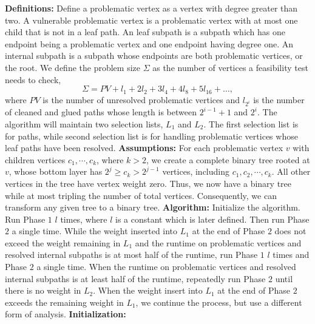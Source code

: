 \documentclass[12pt]{article}
\begin{document}


\begin{spacing}{3}
\noindent\textbf{Definitions:}
Define a problematic vertex as a vertex with degree greater than two. A vulnerable problematic vertex is a problematic vertex with at most one child that is not in a leaf path. An leaf subpath is a subpath which has one endpoint being a problematic vertex and one endpoint having degree one. An internal subpath is a subpath whose endpoints are both problematic vertices, or the root. We define the problem size $\Sigma$ as the number of vertices a feasibility test needs to check,
\[\Sigma=PV+l_1+2l_2+3l_4+4l_8+5l_{16}+\ldots,\]
where $PV$ is the number of unresolved problematic vertices and $l_{2^i}$ is the number of cleaned and glued paths whose length is between $2^{i-1}+1$ and $2^i$. The algorithm will maintain two selection lists, $L_1$ and $L_2$. The first selection list is for paths, while second selection list is for handling problematic vertices whose leaf paths have been resolved.
\vskip 0.2in\noindent
\textbf{Assumptions:}
For each problematic vertex $v$ with children vertices $c_1,\cdots, c_k$, where $k>2$, we create a complete binary tree rooted at $v$, whose bottom layer has $2^j\ge c_k>2^{j-1}$ vertices, including $c_1, c_2,\cdots, c_k$. All other vertices in the tree have vertex weight zero. Thus, we now have a binary tree while at most tripling the number of total vertices. Consequently, we can transform any given tree to a binary tree.
\vskip 0.2in\noindent
\textbf{Algorithm:}
Initialize the algorithm. Run Phase $1$ $l$ times, where $l$ is a constant which is later defined. Then run Phase $2$ a single time. While the weight inserted into $L_1$ at the end of Phase $2$ does not exceed the weight remaining in $L_1$ and the runtime on problematic vertices and resolved internal subpaths is at most half of the runtime, run Phase $1$ $l$ times and Phase $2$ a single time. When the runtime on problematic vertices and resolved internal subpaths is at least half of the runtime, repeatedly run Phase $2$ until there is no weight in $L_2$. When the weight insert into $L_1$ at the end of Phase $2$ exceeds the remaining weight in $L_1$, we continue the process, but use a different form of analysis.
\vskip 0.2in\noindent
\textbf{Initialization:}

\end{spacing}
\end{document}
